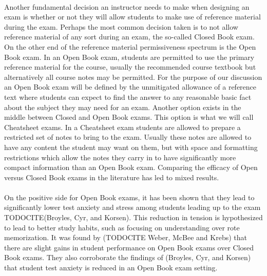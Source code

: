 \documentclass[12pt]{article}
\begin{document}
\paragraph{}
Another fundamental decision an instructor needs to make when designing an exam is whether or not they will allow students to make use of reference material during the exam. Perhaps the most common decision taken is to not allow reference material of any sort during an exam, the so-called Closed Book exam. On the other end of the reference material permissiveness spectrum is the Open Book exam. In an Open Book exam, students are permitted to use the primary reference material for the course, usually the recommended course textbook but alternatively all course notes may be permitted. For the purpose of our discussion an Open Book exam will be defined by the unmitigated allowance of a reference text where students can expect to find the answer to any reasonable basic fact about the subject they may need for an exam. Another option exists in the middle between Closed and Open Book exams. This option is what we will call Cheatsheet exams. In a Cheatsheet exam students are allowed to prepare a restricted set of notes to bring to the exam. Usually these notes are allowed to have any content the student may want on them, but with space and formatting restrictions which allow the notes they carry in to have significantly more compact information than an Open Book exam. Comparing the efficacy of Open versus Closed Book exams in the literature has led to mixed results.
\paragraph{}
On the positive side for Open Book exams, it has been shown that they lead to significantly lower test anxiety and stress among students leading up to the exam TODOCITE(Broyles, Cyr, and Korsen). This reduction in tension is hypothesized to lead to better study habits, such as focusing on understanding over rote memorization. It was found by (TODOCITE Weber, McBee and Krebs) that there are slight gains in student performance on Open Book exams over Closed Book exams. They also corroborate the findings of (Broyles, Cyr, and Korsen) that student test anxiety is reduced in an Open Book exam setting. 
\end{document}
